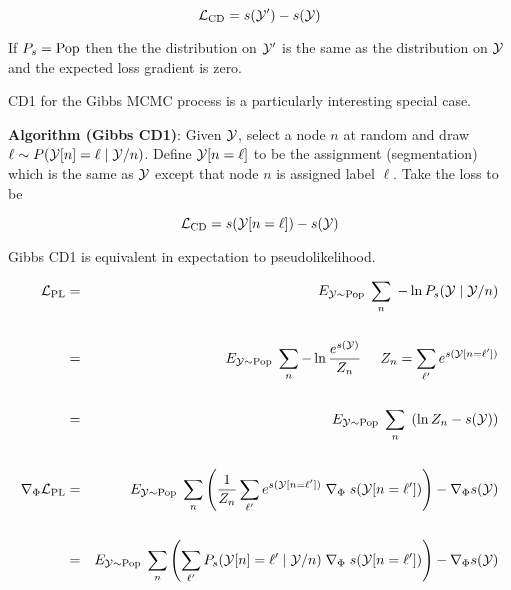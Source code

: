 \vfill
{\color{red} $${\cal L}_{\mathrm{CD}}  = s({\cal Y}') - s({\cal Y})$$}

If $P_s = \mathrm{Pop}$ then the the distribution on ${\cal Y}'$ is the same as the distribution on ${\cal Y}$ and the
expected loss gradient is zero.


CD1 for the Gibbs MCMC process is a particularly interesting special case.

\vfill
{\bf Algorithm (Gibbs CD1)}: Given ${\cal Y}$, select a node $n$ at random and draw {\color{red} $\ell \sim P({\cal Y}[n]=\ell\;| \;{\cal Y}/n)$}. Define {\color{red} ${\cal Y}[n=\ell]$}
to be the assignment (segmentation) which is the same as ${\cal Y}$ except that node $n$ is assigned label $\ell$.  Take the loss to be

\vfill
{\color{red} $${\cal L}_{\mathrm{CD}}  = s({\cal Y}[n=\ell]) - s({\cal Y})$$}


Gibbs CD1 is equivalent in expectation to pseudolikelihood.

{\huge
\begin{eqnarray*}
{\cal L}_{\mathrm{PL}} & = & E_{{\cal Y} \sim \mathrm{Pop}}\;\sum_n \; - \ln P_s({\cal Y}\;|\;{\cal Y}/n) \\
\\
 & = & E_{{\cal Y} \sim \mathrm{Pop}}\;\sum_n -\ln \frac{e^{s({\cal Y})}}{Z_n}\;\;\;\;\;{Z_n = \sum_{\ell'} e^{s({\cal Y}[n=\ell'])}} \\
\\
& = & E_{{\cal Y} \sim \mathrm{Pop}}\;\sum_n\; \left(\ln Z_n - s({\cal Y})\right) \\
\\
\nabla_\Phi {\cal L}_{\mathrm{PL}} & = & E_{{\cal Y} \sim \mathrm{Pop}}\;\sum_n \left(\frac{1}{Z_n} \sum_{\ell'} e^{s({\cal Y}[n=\ell'])} \; \nabla_\Phi\;s({\cal Y}[n=\ell'])\right) - \nabla_\Phi s({\cal Y}) \\
\\
& = & E_{{\cal Y} \sim \mathrm{Pop}}\;\sum_n \left(\sum_{\ell'} P_s({\cal Y}[n]=\ell'\;|\;{\cal Y}/n) \; \nabla_\Phi\;s({\cal Y}[n=\ell'])\right) - \nabla_\Phi s({\cal Y})
\end{eqnarray*}
}


